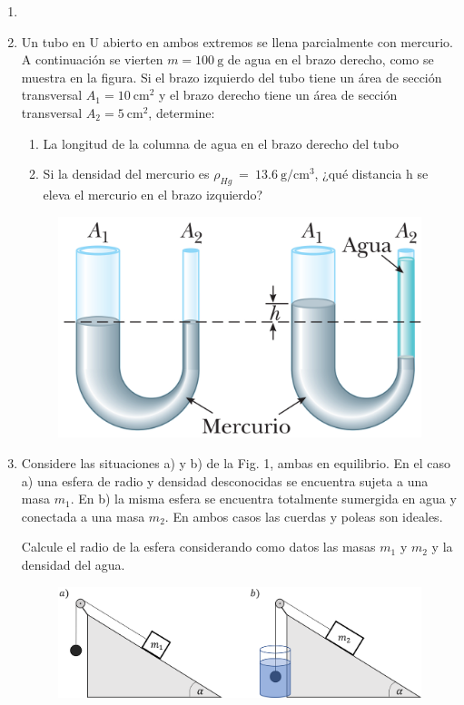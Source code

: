 \documentclass[letterpaper,11pt]{article}
\begin{document}
\vspace{-1cm}
\begin{enumerate}\setlength{\itemsep}{0.4cm}

\item[]

\item Un tubo en U abierto en ambos extremos se llena parcialmente con mercurio. A continuación se vierten $m=\SI{100}{\g}$ de agua en el brazo derecho, como se muestra en la figura. Si el brazo izquierdo del tubo tiene un área de sección transversal $A_1=\SI{10}{\cm^2}$ y el brazo derecho tiene un área de sección transversal $A_2=\SI{5}{\cm^2}$, determine:
\begin{multicols}{2}
    \begin{enumerate}
        \item La longitud de la columna de agua en el brazo derecho del tubo
        \item Si la densidad del mercurio es $\rho_{Hg}~=~\SI{13.6}{\g/\cm^3}$, ¿qué distancia h se eleva el mercurio en el brazo izquierdo?
    \end{enumerate}
    \columnbreak
    \begin{figure}[H]
        \centering
        \includegraphics[width=0.5\linewidth]{2021-2/img/aux13/p2.png}
    \end{figure}
\end{multicols}

\item Considere las situaciones a) y b) de la Fig. 1, ambas en equilibrio. En el caso a) una esfera de radio y densidad desconocidas se encuentra sujeta a una masa $m_1$. En b) la misma esfera se encuentra totalmente sumergida en agua y conectada a una masa $m_2$. En ambos casos las cuerdas y poleas son ideales.   
\vspace{0.05cm}  
    
Calcule el radio de la esfera considerando como datos las masas $m_1$ y $m_2$ y la densidad del agua.
    
    \begin{figure}[H]
        \centering
        \includegraphics[width=0.7\linewidth]{2022-1/img/auxCrec2/esfera.png}
    \end{figure}


\end{enumerate}
\end{document}
